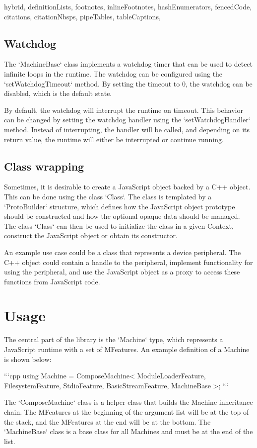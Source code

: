 \begin{markdown*}{%
  hybrid,
  definitionLists,
  footnotes,
  inlineFootnotes,
  hashEnumerators,
  fencedCode,
  citations,
  citationNbsps,
  pipeTables,
  tableCaptions,
}
\subsection{Watchdog}

The `MachineBase` class implements a watchdog timer that can be used to detect infinite loops in the runtime. The watchdog can be configured using the `setWatchdogTimeout` method. By setting the timeout to 0, the watchdog can be disabled, which is the default state.

By default, the watchdog will interrupt the runtime on timeout. This behavior can be changed by setting the watchdog handler using the `setWatchdogHandler` method. Instead of interrupting, the handler will be called, and depending on its return value, the runtime will either be interrupted or continue running.

\subsection{Class wrapping} \label{sub:class-wrapping}

Sometimes, it is desirable to create a JavaScript object backed by a C++ object. This can be done using the class `Class`. The class is templated by a `ProtoBuilder` structure, which defines how the JavaScript object prototype should be constructed and how the optional opaque data should be managed. The class `Class` can then be used to initialize the class in a given Context, construct the JavaScript object or obtain its constructor.

An example use case could be a class that represents a device peripheral. The C++ object could contain a handle to the peripheral, implement functionality for using the peripheral, and use the JavaScript object as a proxy to access these functions from JavaScript code.


\section{Usage} \label{sec:machine-usage}

The central part of the library is the `Machine` type, which represents a JavaScript runtime with a set of MFeatures. An example definition of a Machine is shown below:

```cpp
using Machine = ComposeMachine<
  ModuleLoaderFeature,
  FilesystemFeature,
  StdioFeature,
  BasicStreamFeature,
  MachineBase
>;
```

The `ComposeMachine` class is a helper class that builds the Machine inheritance chain. The MFeatures at the beginning of the argument list will be at the top of the stack, and the MFeatures at the end will be at the bottom. The `MachineBase` class is a base class for all Machines and must be at the end of the list.


\end{markdown*}
